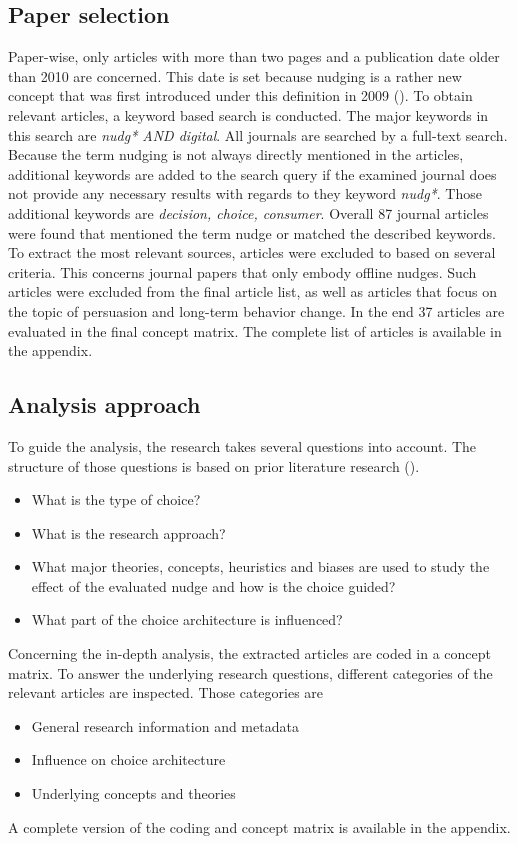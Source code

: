 \subsection{Paper selection}
Paper-wise, only articles with more than two pages and a publication date older than 2010 are concerned. This date is set because nudging is a rather new concept that was first introduced under this definition in 2009 (\cite{thaler_nudge:_2009}). To obtain relevant articles, a keyword based search is conducted. The major keywords in this search are \textit{nudg* AND digital}. All journals are searched by a full-text search. Because the term nudging is not always directly mentioned in the articles, additional keywords are added to the search query if the examined journal does not provide any necessary results with regards to they keyword \textit{nudg*}. Those additional keywords are \textit{decision, choice, consumer}. Overall 87 journal articles were found that mentioned the term nudge or matched the described keywords. To extract the most relevant sources, articles were excluded to based on several criteria. This concerns journal papers that only embody offline nudges. Such articles were excluded from the final article list, as well as articles that focus on the topic of persuasion and long-term behavior change. In the end 37 articles are evaluated in the final concept matrix. The complete list of articles is available in the appendix. %

\subsection{Analysis approach}
To guide the analysis, the research takes several questions into account. The structure of those questions is based on prior literature research (\cite{alavi_review_1992}).
\begin{itemize}
\item What is the type of choice?
\item What is the research approach?
\item What major theories, concepts, heuristics and biases are used to study the effect of the evaluated nudge and how is the choice guided?
\item What part of the choice architecture is influenced?
\end{itemize}

Concerning the in-depth analysis, the extracted articles are coded in a concept matrix. To answer the underlying research questions, different categories of the relevant articles are inspected. Those categories are 
\begin{itemize}
\item General research information and metadata
\item Influence on choice architecture
\item Underlying concepts and theories
\end{itemize}

A complete version of the coding and concept matrix is available in the appendix. %